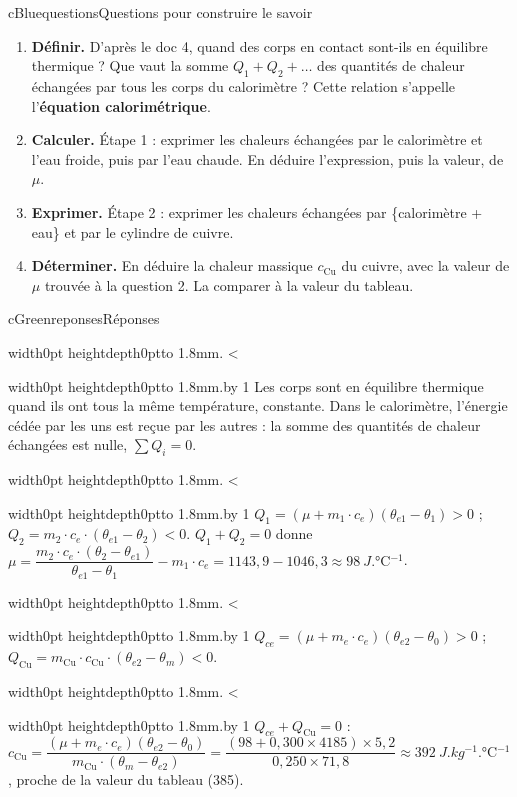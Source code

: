 \documentclass[11pt,a4paper]{article}
\newcommand{\kw}[1]{{\sffamily\bfseries\color{cBlue}#1}}   %
\newif\ifeleve
\newlength{\interligne}\setlength{\interligne}{7mm}
\newlength{\replen}
\newcommand{\pointilles}{{\color{cInk2!60}\leaders\hbox to 1.8mm{\hss.\hss}\hfill}\kern0pt}
\newcommand{\lignes}[1]{\leavevmode\vrule width0pt height\dimexpr\interligne-1mm\relax depth0pt\pointilles
  \lgn=1 \loop\ifnum\lgn<#1 \par\nointerlineskip\noindent\vrule width0pt height\interligne depth0pt\pointilles\advance\lgn by 1 \repeat}
\newcommand{\rep}[1]{%
  \ifeleve
    \sbox{\repbox}{\parbox{\linewidth}{#1}}%
    \replen=\dimexpr\ht\repbox+\dp\repbox\relax
    \repn=\numexpr\replen/\baselineskip+1\relax
    \ifnum\repn<2 \repn=2\fi
    \edef\nblignes{\the\repn}\lignes{\nblignes}%
  \else #1\fi}
\newcommand{\titrereponses}{\ifeleve Mes réponses\else Réponses\fi}
\begin{document}
\begin{rub}{cBlue}{questions}{Questions pour construire le savoir}
\begin{enumerate}
  \item \kw{Définir.} D’après le doc 4, quand des corps en contact sont-ils en équilibre thermique ? Que vaut la somme $Q_1 + Q_2 + \dots$ des quantités de chaleur échangées par tous les corps du calorimètre ? Cette relation s’appelle l’\textbf{équation calorimétrique}.
  \item \kw{Calculer.} Étape 1 : exprimer les chaleurs échangées par le calorimètre et l’eau froide, puis par l’eau chaude. En déduire l’expression, puis la valeur, de $\mu$.
  \item \kw{Exprimer.} Étape 2 : exprimer les chaleurs échangées par \{calorimètre + eau\} et par le cylindre de cuivre.
  \item \kw{Déterminer.} En déduire la chaleur massique $c_{\mathrm{Cu}}$ du cuivre, avec la valeur de $\mu$ trouvée à la question 2. La comparer à la valeur du tableau.
\end{enumerate}
\end{rub}

\begin{rub}{cGreen}{reponses}{\titrereponses}
\begin{reps}
  \item \rep{Les corps sont en équilibre thermique quand ils ont tous la même température, constante. Dans le calorimètre, l’énergie cédée par les uns est reçue par les autres : la somme des quantités de chaleur échangées est nulle, $\sum Q_i = 0$.}
  \item \rep{$Q_1 = (\mu + m_1\cdot c_e)(\theta_{e1} - \theta_1) > 0$ ; $Q_2 = m_2\cdot c_e\cdot(\theta_{e1} - \theta_2) < 0$. $Q_1 + Q_2 = 0$ donne $\mu = \dfrac{m_2\cdot c_e\cdot(\theta_2 - \theta_{e1})}{\theta_{e1} - \theta_1} - m_1\cdot c_e = 1143{,}9 - 1046{,}3 \approx \qty{98}{J.\degreeCelsius^{-1}}$.}
  \item \rep{$Q_{ce} = (\mu + m_e\cdot c_e)(\theta_{e2} - \theta_0) > 0$ ; $Q_{\mathrm{Cu}} = m_{\mathrm{Cu}}\cdot c_{\mathrm{Cu}}\cdot(\theta_{e2} - \theta_m) < 0$.}
  \item \rep{$Q_{ce} + Q_{\mathrm{Cu}} = 0$ : $c_{\mathrm{Cu}} = \dfrac{(\mu + m_e\cdot c_e)(\theta_{e2} - \theta_0)}{m_{\mathrm{Cu}}\cdot(\theta_m - \theta_{e2})} = \dfrac{(98 + 0{,}300\times4185)\times5{,}2}{0{,}250\times71{,}8} \approx \qty{392}{J.kg^{-1}.\degreeCelsius^{-1}}$, proche de la valeur du tableau (385).}
\end{reps}
\end{rub}
\end{document}
